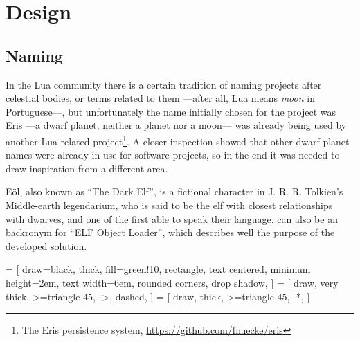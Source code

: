 \cleardoublepage
\chapter{Design}

\section{Naming}

In the Lua community there is a certain tradition of naming projects after
celestial bodies, or terms related to them —after all, Lua means \emph{moon}
in Portuguese—, but unfortunately the name initially chosen for the project
was Eris —a dwarf planet, neither a planet nor a moon— was already being used
by another Lua-related project\footnote{The Eris persistence system,
\url{https://github.com/fnuecke/eris}}. A closer inspection showed that other
dwarf planet names were already in use for software projects, so in the end
it was needed to draw inspiration from a different area.

Eöl, also known as “The Dark Elf”, is a fictional character in
J. R. R. Tolkien's Middle-earth legendarium, who is said to be the elf with
closest relationships with dwarves, and one of the first able to speak their
language.  \Eol* can also be an \gls{backronym} for “ELF Object Loader”,
which describes well the purpose of the developed solution.

 = [
  draw=black,
  thick,
  fill=green!10,
  rectangle,
  text centered,
  minimum height=2em,
  text width=6em,
  rounded corners,
  drop shadow,
]
 = [
  draw,
  very thick,
  >=triangle 45,
  ->,
  dashed,
]
 = [
  draw,
  thick,
  >=triangle 45,
  -*,
]

